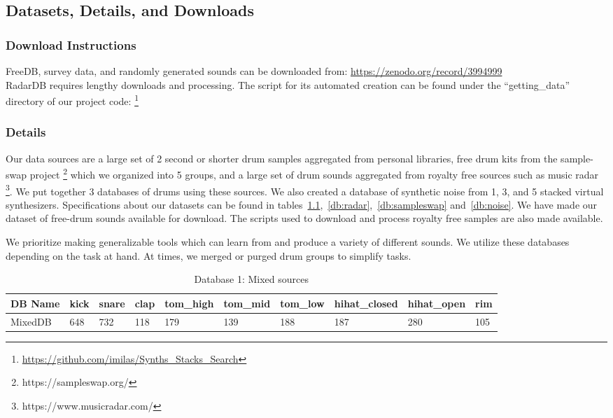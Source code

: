 \documentclass[runningheads,a4paper]{llncs}
\begin{document}



\begin{appendices}
\chapter{Datasets, Details, and Downloads}
\label{appendix:datasets}
\subsection{Download Instructions}
FreeDB, survey data, and randomly generated sounds can be downloaded from: \url{https://zenodo.org/record/3994999}\\
RadarDB requires lengthy downloads and processing. The script for its automated creation can be found under the \enquote{getting\_data} directory of our project code: \footnote{\url{https://github.com/imilas/Synths_Stacks_Search}}
\subsection{Details}
Our data sources are a large set of 2 second or shorter drum samples aggregated from personal libraries, free drum kits from the sample-swap project \footnote{https://sampleswap.org/} which we organized into 5 groups, and a large set of drum sounds aggregated from royalty free sources such as music radar \footnote{https://www.musicradar.com/}. We put together 3 databases of drums using these sources. We also created a database of synthetic noise from 1, 3, and 5 stacked virtual synthesizers. Specifications about our datasets can be found in tables~\ref{db:self},~\ref{db:radar},~\ref{db:sampleswap} and~\ref{db:noise}. We have made our dataset of free-drum sounds available for download. The scripts used to download and process royalty free samples are also made available. 

We prioritize making generalizable tools which can learn from and produce a variety of different sounds. We utilize these databases depending on the task at hand. At times, we merged or purged drum groups to simplify tasks.
\begin{table}[]
\centering
\begin{tabular}[width=\paperwidth]{|l|l|l|l|l|l|l|l|l|l|}
\hline
DB Name & kick & snare & clap & tom\_high & tom\_mid & tom\_low & hihat\_closed &  hihat\_open & rim \\ \hline
MixedDB & 648 & 732 & 118 & 179 & 139 &  188 & 187 & 280 & 105 \\\hline
\end{tabular}
\caption{Database 1: Mixed sources}
\label{db:self}
\end{table}


\end{appendices}
\end{document}
